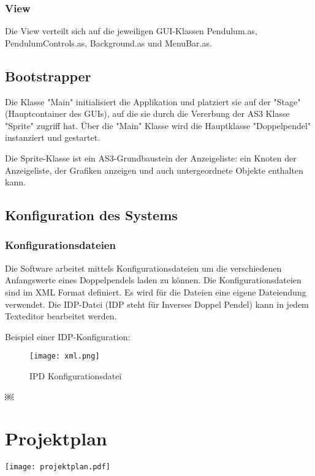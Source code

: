 \documentclass[12pt]{article}
\numberwithin{equation}{subsection}
\begin{document}
\subsubsection{View}
Die View verteilt sich auf die jeweiligen GUI-Klassen Pendulum.as, PendulumControls.as, Background.as und MenuBar.as.


\subsection{Bootstrapper}
Die Klasse "Main" initialisiert die Applikation und platziert sie auf der "Stage" (Hauptcontainer des GUIs), auf die sie durch die Vererbung der AS3 Klasse "Sprite" zugriff hat. Über die "Main" Klasse wird die Hauptklasse "Doppelpendel" instanziert und gestartet. 

Die Sprite-Klasse ist ein AS3-Grundbaustein der Anzeigeliste: ein Knoten der Anzeigeliste, der Grafiken anzeigen und auch untergeordnete Objekte enthalten kann.

\subsection{Konfiguration des Systems}

\subsubsection{Konfigurationsdateien}
Die Software arbeitet mittels Konfigurationsdateien um die verschiedenen Anfangswerte eines Doppelpendels laden zu können. Die Konfigurationsdateien sind im XML Format definiert. Es wird für die Dateien eine eigene Dateiendung verwendet. Die IDP-Datei (IDP steht für Inverses Doppel Pendel) kann in jedem Texteditor bearbeitet werden.

Beispiel einer IDP-Konfiguration:

\begin{figure}[H]
	\centering
	\texttt{[image: xml.png]}
	\caption{IPD Konfigurationsdatei}
	\label{fig:xml}
\end{figure}

\newpage
￼\listoffigures

\newpage
\nocite{*}



\appendix
\section{Projektplan}
\texttt{[image: projektplan.pdf]}
\end{document}
